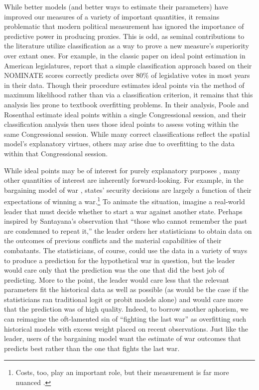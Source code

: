 While better models (and better ways to estimate their parameters) have improved our measures of a variety of important quantities, it remains problematic that modern political measurement has ignored the importance of predictive power in producing proxies. 
This is odd, as seminal contributions to the literature utilize classification as a way to prove a new measure's superiority over extant ones. For example, in the classic paper on ideal point estimation in American legislatures, \citet[Table 3]{poole1985} report that a simple classification approach based on their NOMINATE scores correctly predicts over 80\% of legislative votes in most years in their data. Though their procedure estimates ideal points via the method of maximum likelihood rather than via a classification criterion, it remains that this analysis lies prone to textbook overfitting problems. 
In their analysis, Poole and Rosenthal estimate ideal points within a single Congressional session, and their classification analysis then uses those ideal points to assess voting within the same Congressional session. 
While many correct classifications reflect the spatial model's explanatory virtues, others may arise due to overfitting to the data within that Congressional session.


While ideal points may be of interest for purely explanatory purposes \citep{clarke2012}, many other quantities of interest are inherently forward-looking. 
For example, in the bargaining model of war \citep{fearon1995}, states' security decisions are largely a function of their expectations of winning a war.\footnote{Costs, too, play an important role, but their measurement is far more nuanced \citep{stiglitz2008,stiglitz2012}.} 
To animate the situation, imagine a real-world leader that must decide whether to start a war against another state. 
Perhaps inspired by Santayana's observation that ``those who cannot remember the past are condemned to repeat it,'' the leader orders her statisticians to obtain data on the outcomes of previous conflicts and the material capabilities of their combatants. 
The statisticians, of course, could use the data in a variety of ways to produce a prediction for the hypothetical war in question, but the leader would care only that the prediction was the one that did the best job of predicting. 
More to the point, the leader would care less that the relevant parameters fit the historical data as well as possible (as would be the case if the statisticians ran traditional logit or probit models alone) and would care more that the prediction was of high quality. 
Indeed, to borrow another aphorism, we can reimagine the oft-lamented sin of ``fighting the last war'' \citep[e.g.][]{hart1972} as overfitting such historical models with excess weight placed on recent observations. 
Just like the leader, users of the bargaining model want the estimate of war outcomes that predicts best rather than the one that fights the last war.


